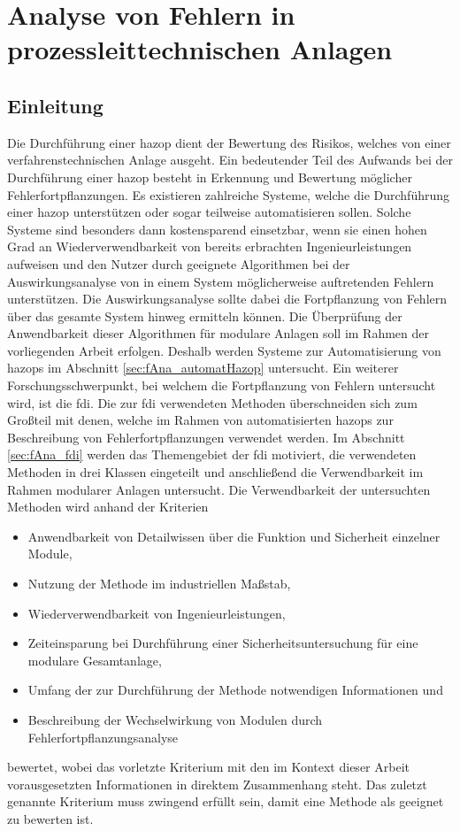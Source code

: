 \chapter{Analyse von Fehlern in prozessleittechnischen Anlagen} \label{ch:fehlerfortpfl}
\section{Einleitung}
Die Durchf\"uhrung einer \ac{hazop} dient der Bewertung des Risikos, welches von einer verfahrenstechnischen Anlage ausgeht. Ein bedeutender Teil des Aufwands bei der Durchf\"uhrung einer \ac{hazop} besteht in Erkennung und Bewertung m\"oglicher Fehlerfortpflanzungen. \newline
Es existieren zahlreiche Systeme, welche die Durchf\"uhrung einer \ac{hazop} unterst\"utzen oder sogar teilweise automatisieren sollen. Solche Systeme sind besonders dann kostensparend einsetzbar, wenn sie einen hohen Grad an Wiederverwendbarkeit von bereits erbrachten Ingenieurleistungen aufweisen und den Nutzer durch geeignete Algorithmen bei der Auswirkungsanalyse von in einem System m\"oglicherweise auftretenden Fehlern unterst\"utzen. Die Auswirkungsanalyse sollte dabei die Fortpflanzung von Fehlern \"uber das gesamte System hinweg ermitteln k\"onnen. Die \"Uberpr\"ufung der Anwendbarkeit dieser Algorithmen f\"ur modulare Anlagen soll im Rahmen der vorliegenden Arbeit erfolgen. Deshalb werden Systeme zur Automatisierung von \acp{hazop} im Abschnitt \ref{sec:fAna_automatHazop} untersucht. \newline
Ein weiterer Forschungsschwerpunkt, bei welchem die Fortpflanzung von Fehlern untersucht wird, ist die \acf{fdi}. Die zur \ac{fdi} verwendeten Methoden \"uberschneiden sich zum Gro\ss{}teil mit denen, welche im Rahmen von automatisierten \acp{hazop} zur Beschreibung von Fehlerfortpflanzungen verwendet werden. Im Abschnitt \ref{sec:fAna_fdi} werden das Themengebiet der \ac{fdi} motiviert, die verwendeten Methoden in drei Klassen eingeteilt und anschlie\ss{}end die Verwendbarkeit im Rahmen modularer Anlagen untersucht. Die Verwendbarkeit der untersuchten Methoden wird anhand der Kriterien 
\begin{itemize}
\item Anwendbarkeit von Detailwissen \"uber die Funktion und Sicherheit einzelner Module,
\item Nutzung der Methode im industriellen Ma\ss{}stab, 
\item Wiederverwendbarkeit von Ingenieurleistungen,
\item Zeiteinsparung bei Durchf\"uhrung einer Sicherheitsuntersuchung f\"ur eine modulare Gesamtanlage,
\item Umfang der zur Durchf\"uhrung der Methode notwendigen Informationen und
\item Beschreibung der Wechselwirkung von Modulen durch Fehlerfortpflanzungsanalyse
\end{itemize} bewertet, wobei das vorletzte Kriterium mit den im Kontext dieser Arbeit vorausgesetzten Informationen in direktem Zusammenhang steht. Das zuletzt genannte Kriterium muss zwingend erf\"ullt sein, damit eine Methode als geeignet zu bewerten ist.
 
